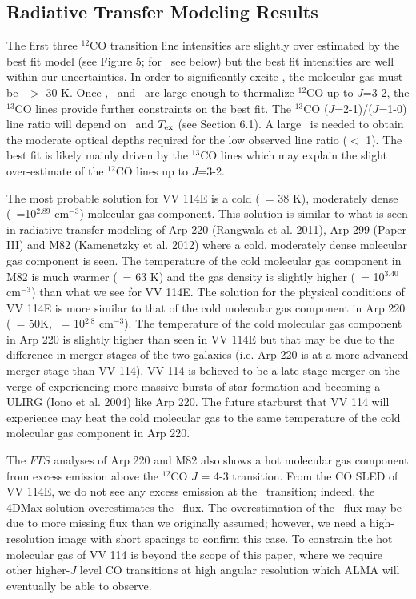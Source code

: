  
\subsection{Radiative Transfer Modeling Results}%

The first three $^{12}$CO transition line intensities are slightly over estimated by the best fit model (see Figure 5; for \cosix\ see below) but the best fit intensities are well within our uncertainties. In order to significantly excite \cothree, the molecular gas must be \tkin\ $>$ 30 K. Once \nhtwo, \tkin\ and \nco\ are large enough to thermalize $^{12}$CO up to $J$=3-2, the $^{13}$CO lines provide further constraints on the best fit.  The $^{13}$CO ($J$=2-1)/($J$=1-0) line ratio will depend on \nthreeco\ and $T_{\rm{ex}}$ (see Section 6.1). A large \nthreeco\ is needed to obtain the moderate optical depths required for the low observed line ratio ($<$ 1). The best fit is likely mainly driven by the $^{13}$CO lines which may explain the slight over-estimate of the $^{12}$CO lines up to $J$=3-2. 


The most probable solution for VV 114E is a cold (\tkin\ = 38 K), moderately dense (\nhtwo\ =10$^{2.89}$ cm$^{-3}$) molecular gas component. This solution is similar to what is seen in radiative transfer modeling of Arp 220 (Rangwala et al. 2011), Arp 299 (Paper III) and M82 (Kamenetzky et al. 2012) where a cold, moderately dense molecular gas component is seen. The temperature of the cold molecular gas component in M82 is much warmer (\tkin\ = 63 K) and the gas density is slightly higher (\nhtwo\ = 10$^{3.40}$ cm$^{-3}$) than what we see for VV 114E.  The solution for the physical conditions of VV 114E is more similar to that of the cold molecular gas component in Arp 220 (\tkin\ = 50K, \nhtwo\ = 10$^{2.8}$ cm$^{-3}$). The temperature of the cold molecular gas component in Arp 220 is slightly higher than seen in VV 114E but that may be due to the difference in merger stages of the two galaxies (i.e. Arp 220 is at a more advanced merger stage than VV 114). VV 114 is believed to be a late-stage merger on the verge of experiencing more massive bursts of star formation and becoming a ULIRG (Iono et al. 2004)\nocite{2004ApJ...616L..63I} like Arp 220. The future starburst that VV 114 will experience may heat the cold molecular gas to the same temperature of the cold molecular gas component in Arp 220. 

The $FTS$ analyses of Arp 220 and M82 also shows a hot molecular gas component from excess emission above the $^{12}$CO $J$ = 4-3 transition. From the CO SLED of VV 114E, we do not see any excess emission at the \cosix\ transition; indeed, the 4DMax solution overestimates the \cosix\ flux. The overestimation of the \cosix\ flux may be due to more missing flux than we originally assumed; however, we need a high-resolution image with short spacings to confirm this case. To constrain the hot molecular gas of VV 114 is beyond the scope of this paper, where we require other higher-$J$ level CO transitions at high angular resolution which ALMA will eventually be able to observe. 

